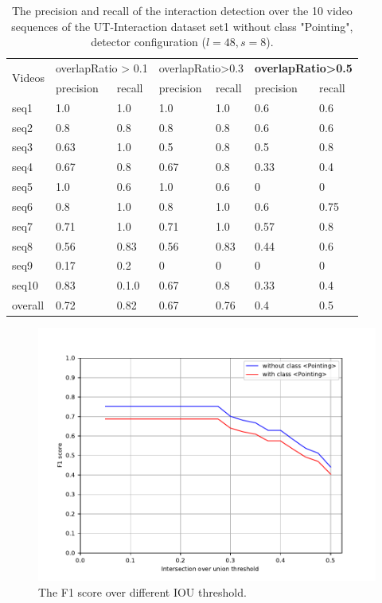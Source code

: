 \begin{table}
	\caption{The precision and recall of the interaction detection over the 10 video sequences of the UT-Interaction dataset set1 without class "Pointing", detector configuration (\(l=48, s=8\)).}
	\begin{center}
		\begin{tabular}{| m{2cm} || m{1.5cm} | m{1.5cm} | m{1.5cm} | m{1.5cm} | m{1.5cm} | m{1.5cm} |}
			\hline
			\multirow{2}{*}{Videos} & \multicolumn{2}{c|}{overlapRatio > 0.1} & \multicolumn{2}{c|}{overlapRatio>0.3} & \multicolumn{2}{c|}{\textbf{overlapRatio>0.5}} \\ \cline{2-7}
			& precision & recall & precision & recall & precision & recall \\ \hline \hline
			
			seq1 & 1.0   & 1.0   & 1.0   & 1.0  & 0.6  & 0.6 \\ \hline
			seq2 & 0.8   & 0.8   & 0.8   & 0.8  & 0.6  & 0.6 \\ \hline
			seq3 & 0.63  & 1.0   & 0.5   & 0.8  & 0.5  & 0.8 \\ \hline
			seq4 & 0.67  & 0.8   & 0.67  & 0.8  & 0.33 & 0.4 \\ \hline
			seq5 & 1.0   & 0.6   & 1.0   & 0.6  & 0    &  0   \\ \hline
			seq6 & 0.8   & 1.0   & 0.8   & 1.0  & 0.6  & 0.75  \\ \hline
			seq7 & 0.71  & 1.0   & 0.71  & 1.0  & 0.57 & 0.8 \\ \hline
			seq8 & 0.56  & 0.83  & 0.56  & 0.83 & 0.44 & 0.6 \\ \hline
			seq9 & 0.17  & 0.2   & 0     & 0    & 0    & 0    \\ \hline
			seq10 & 0.83 & 0.1.0  & 0.67  & 0.8  & 0.33 & 0.4 \\ \hline
			overall & 0.72 & 0.82 & 0.67 & 0.76 & 0.4  & 0.5 \\ \hline	 
		\end{tabular}
		\label{table:pr_ex3}
	\end{center}
\end{table}

\begin{figure}
	\includegraphics[trim=0cm 0cm 0cm 0cm]{fig01/plot_f1score.pdf}
	\caption{The F1 score over different IOU threshold.}
	\label{fig:plot_f1score}
\end{figure}
\par

